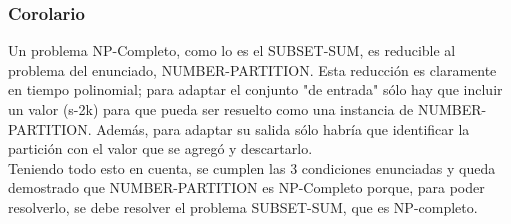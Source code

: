\subsubsection{Corolario}
Un problema NP-Completo, como lo es el SUBSET-SUM, es reducible al problema del enunciado, NUMBER-PARTITION. Esta reducción es claramente en tiempo polinomial; para adaptar el conjunto "de entrada" sólo hay que incluir un valor (s-2k) para que pueda ser resuelto como una instancia de NUMBER-PARTITION. Además, para adaptar su salida sólo habría que identificar la partición con el valor que se agregó y descartarlo.\\
Teniendo todo esto en cuenta, se cumplen las 3 condiciones enunciadas y queda demostrado que NUMBER-PARTITION es NP-Completo porque, para poder resolverlo, se debe resolver el problema SUBSET-SUM, que es NP-completo.
